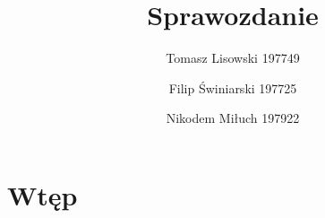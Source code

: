 \documentclass{article} %
\title{Sprawozdanie}
\author{Tomasz Lisowski 197749\and Filip Świniarski 197725\and Nikodem Miłuch 197922}
\begin{document}
\maketitle

\section{Wtęp}
\end{document}
